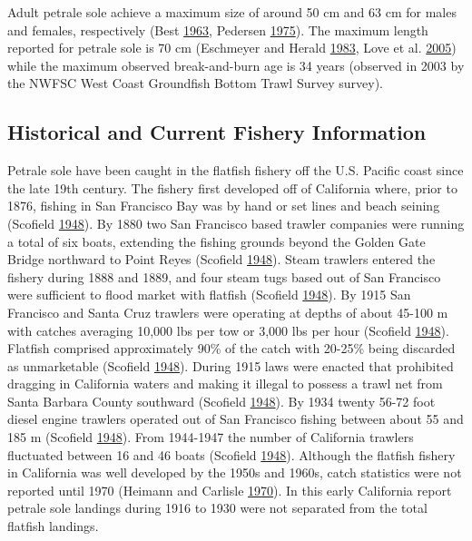 \documentclass[12pt,]{article}
\begin{document}
Adult petrale sole achieve a maximum size of around 50 cm and 63 cm for
males and females, respectively (Best
\protect\hyperlink{ref-best_e.a._movements_1963}{1963}, Pedersen
\protect\hyperlink{ref-pedersen_movements_1975}{1975}). The maximum
length reported for petrale sole is 70 cm (Eschmeyer and Herald
\protect\hyperlink{ref-eschmeyer_field_1983}{1983}, Love et al.
\protect\hyperlink{ref-love_milton_resource_2005}{2005}) while the
maximum observed break-and-burn age is 34 years (observed in 2003 by the
NWFSC West Coast Groundfish Bottom Trawl Survey survey).

\subsection{Historical and Current Fishery
Information}\label{historical-and-current-fishery-information}

Petrale sole have been caught in the flatfish fishery off the U.S.
Pacific coast since the late 19th century. The fishery first developed
off of California where, prior to 1876, fishing in San Francisco Bay was
by hand or set lines and beach seining (Scofield
\protect\hyperlink{ref-scofield_trawling_1948}{1948}). By 1880 two San
Francisco based trawler companies were running a total of six boats,
extending the fishing grounds beyond the Golden Gate Bridge northward to
Point Reyes (Scofield
\protect\hyperlink{ref-scofield_trawling_1948}{1948}). Steam trawlers
entered the fishery during 1888 and 1889, and four steam tugs based out
of San Francisco were sufficient to flood market with flatfish (Scofield
\protect\hyperlink{ref-scofield_trawling_1948}{1948}). By 1915 San
Francisco and Santa Cruz trawlers were operating at depths of about
45-100 m with catches averaging 10,000 lbs per tow or 3,000 lbs per hour
(Scofield \protect\hyperlink{ref-scofield_trawling_1948}{1948}).
Flatfish comprised approximately 90\% of the catch with 20-25\% being
discarded as unmarketable (Scofield
\protect\hyperlink{ref-scofield_trawling_1948}{1948}). During 1915 laws
were enacted that prohibited dragging in California waters and making it
illegal to possess a trawl net from Santa Barbara County southward
(Scofield \protect\hyperlink{ref-scofield_trawling_1948}{1948}). By 1934
twenty 56-72 foot diesel engine trawlers operated out of San Francisco
fishing between about 55 and 185 m (Scofield
\protect\hyperlink{ref-scofield_trawling_1948}{1948}). From 1944-1947
the number of California trawlers fluctuated between 16 and 46 boats
(Scofield \protect\hyperlink{ref-scofield_trawling_1948}{1948}).
Although the flatfish fishery in California was well developed by the
1950s and 1960s, catch statistics were not reported until 1970 (Heimann
and Carlisle \protect\hyperlink{ref-heimann_pacific_1970}{1970}). In
this early California report petrale sole landings during 1916 to 1930
were not separated from the total flatfish landings.
\end{document}
